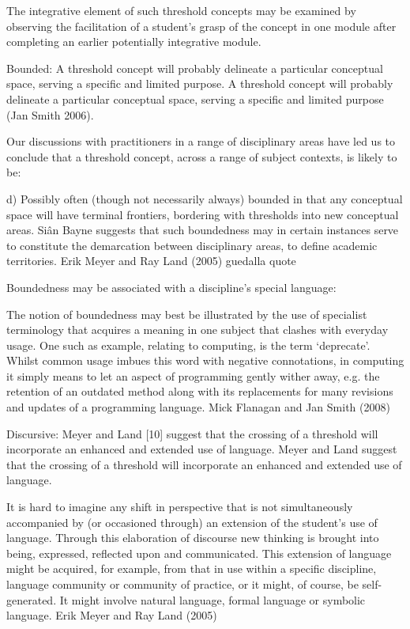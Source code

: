 \documentclass{tufte-book}\usepackage[]{graphicx}\usepackage[]{xcolor}
\begin{document}
The integrative element of such threshold concepts may be examined by observing the facilitation of a student’s grasp of the concept in one module after completing an earlier potentially integrative module.

Bounded: A threshold concept will probably delineate a particular conceptual space, serving a specific and limited purpose. A threshold concept will probably delineate a particular conceptual space, serving a specific and limited purpose (Jan Smith 2006).

Our discussions with practitioners in a range of disciplinary areas have led us to conclude that a threshold concept, across a range of subject contexts, is likely to be:

d) Possibly often (though not necessarily always) bounded in that any conceptual space will have terminal frontiers, bordering with thresholds into new conceptual areas. Siân Bayne suggests that such boundedness may in certain instances serve to constitute the demarcation between disciplinary areas, to define academic territories.
                                                                    Erik Meyer and Ray Land (2005)
guedalla quote

Boundedness may be associated with a discipline’s special language:

The notion of boundedness may best be illustrated by the use of specialist terminology that acquires a meaning in one subject that clashes with everyday usage. One such as example, relating to computing, is the term ‘deprecate’. Whilst common usage imbues this word with negative connotations, in computing it simply means to let an aspect of programming gently wither away, e.g. the retention of an outdated method along with its replacements for many revisions and updates of a programming language.
                                                                    Mick Flanagan and Jan Smith (2008)

Discursive: Meyer and Land [10] suggest that the crossing of a threshold will incorporate an enhanced and extended use of language. Meyer and Land suggest that the crossing of a threshold will incorporate an enhanced and extended use of language.

It is hard to imagine any shift in perspective that is not simultaneously accompanied by (or occasioned through) an extension of the student's use of language. Through this elaboration of discourse new thinking is brought into being, expressed, reflected upon and communicated. This extension of language might be acquired, for example, from that in use within a specific discipline, language community or community of practice, or it might, of course, be self-generated. It might involve natural language, formal language or symbolic language.
Erik Meyer and Ray Land (2005)
\end{document}
